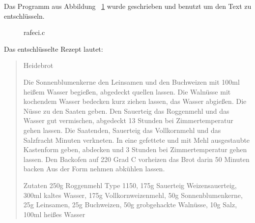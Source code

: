 Das Programm aus Abbildung ~\ref{fig:rafeci} wurde geschrieben und benutzt um den Text zu
entschlüsseln.

\begin{figure}[p]

\caption{rafeci.c}
\label{fig:rafeci}
\end{figure}

Das entschlüsselte Rezept lautet:

\begin{quote}
Heidebrot

Die Sonnenblumenkerne den Leinsamen und den Buchweizen mit 100ml heißem Wasser begießen, abgedeckt quellen lassen.
Die Walnüsse mit kochendem Wasser bedecken kurz ziehen lassen, das Wasser abgießen. Die Nüsse zu den Saaten geben.
Den Sauerteig das Roggenmehl und das Wasser gut vermischen, abgedeckt 13 Stunden bei Zimmertemperatur gehen lassen.
Die Saatenden, Sauerteig das Vollkornmehl und das Salzfracht Minuten verkneten. In eine gefettete und mit Mehl
ausgestaubte Kastenform geben, abdecken und 3 Stunden bei Zimmertemperatur gehen lassen. Den Backofen auf 220 Grad C vorheizen
das Brot darin 50 Minuten backen Aus der Form nehmen abkühlen lassen.

Zutaten
250g Roggenmehl Type 1150, 175g Sauerteig Weizensauerteig, 300ml kaltes Wasser, 175g Vollkornweizenmehl, 50g
Sonnenblumenkerne, 25g Leinsamen, 25g Buchweizen, 50g grobgehackte Walnüsse, 10g Salz, 100ml heißes Wasser
\end{quote}
